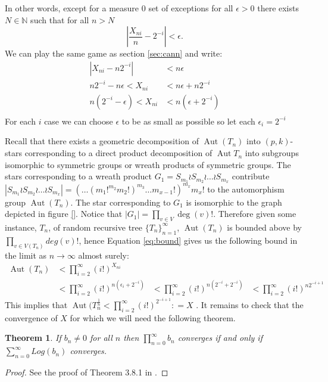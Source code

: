\documentclass[oneside]{book} %
\newtheorem{thm}{Theorem}[section]
\theoremstyle{definition}
\numberwithin{equation}{section}
\DeclareMathOperator{\Aut}{Aut} %
\begin{document}
In other words, except for a measure 0 set of exceptions for all $ \epsilon >0 $ there exists $N \in \mathbb{N}$ such that for all $n > N$ 
\[| \frac{X_{ni}}{n} - 2^{-i}| < \epsilon. \]
We can play the same game as section \ref{sec:cann} and write:
\begin{align}\label{eq:bound}
|X_{ni} - n2^{-i}| &< n\epsilon \\
n2^{-i} -n\epsilon < X_{ni} &< n\epsilon +n2^{-i} \\
n(2^{-i} -\epsilon) < X_{ni} &< n(\epsilon +2^{-i}) \\
\end{align}
For each $i$ case we can choose $\epsilon$ to be as small as possible so let each $\epsilon_{i}  = 2^{-i}$ %

Recall that there exists a geometric decomposition of $\Aut(T_n)$ into $(p,k)$-stars corresponding to a direct product decomposition of $\Aut{T_n}$ into subgroups isomorphic to symmetric groups or wreath products of symmetric groups. The stars corresponding to a wreath product $G_1 = S_{m_{1}}\wr S_{m_{2}}\wr \dots \wr S_{m_x}$ contribute $|S_{m_{1}}\wr S_{m_{2}}\wr \dots \wr S_{m_x}| = (\dots(m_1!^{m_2}m_2!)^{m_3}\dots m_{x-1}!)^{m_x}m_x!$ to the automorphism group $\Aut(T_n)$.  The star corresponding to $G_1$ is isomorphic to the graph depicted in figure \ref{}.  Notice that $|G_{1}|  = \prod_{v \in V}\deg(v)!$.  Therefore   
given some instance, $T_n$, of random recursive tree $\{T_{n}\}_{n=1}^{\infty}$, $\Aut(T_n)$ is bounded above by $\prod_{v \in V(T_n)}deg(v)!$, hence Equation \ref{eq:bound} gives us the following bound in the limit as $n \rightarrow \infty$ almost surely:
\begin{align}
\Aut(T_n)&< \prod_{i=2}^{\infty}(i!)^{X_{ni}}\\
&< \prod_{i=2}^{\infty}(i!)^{n(\epsilon_{i} + 2^{-i})}
&< \prod_{i=2}^{\infty}(i!)^{n(2^{-i} + 2^{-i})}
&< \prod_{i=2}^{\infty}(i!)^{n2^{-i+1}}
\end{align}
This implies that $\Aut(T_{n}^{\frac{1}{n}} < \prod_{i=2}^{\infty}(i!)^{2^{-i+1}} : = X$ .  It remains to check that the convergence of $X$ for which we will need the following theorem.

\begin{thm}
 If $b_n \neq 0$  for all $n$ then $\prod_{n=0}^{\infty}b_{n}$ converges if and only if $\sum_{n=0}^{\infty}Log(b_{n})$ converges. 
\end{thm}
\begin{proof}
 See the proof of Theorem 3.8.1 in \cite{JonesandSingerman}.
\end{proof}
\end{document}
